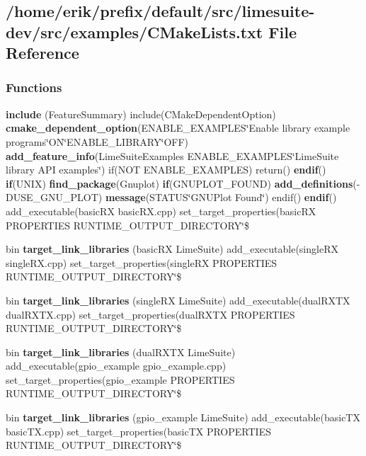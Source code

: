 \subsection{/home/erik/prefix/default/src/limesuite-\/dev/src/examples/\+C\+Make\+Lists.txt File Reference}
\label{limesuite-dev_2src_2examples_2CMakeLists_8txt}
\subsubsection*{Functions}
\begin{DoxyCompactItemize}
\item 
{\bf include} (Feature\+Summary) include(C\+Make\+Dependent\+Option) {\bf cmake\+\_\+dependent\+\_\+option}(E\+N\+A\+B\+L\+E\+\_\+\+E\+X\+A\+M\+P\+L\+ES\char`\"{}Enable library example programs\char`\"{}ON\char`\"{}E\+N\+A\+B\+L\+E\+\_\+\+L\+I\+B\+R\+A\+RY\char`\"{}O\+FF) {\bf add\+\_\+feature\+\_\+info}(Lime\+Suite\+Examples E\+N\+A\+B\+L\+E\+\_\+\+E\+X\+A\+M\+P\+L\+ES\char`\"{}Lime\+Suite library A\+PI examples\char`\"{}) if(N\+OT E\+N\+A\+B\+L\+E\+\_\+\+E\+X\+A\+M\+P\+L\+ES) return() {\bf endif}() {\bf if}(U\+N\+IX) {\bf find\+\_\+package}(Gnuplot) {\bf if}(G\+N\+U\+P\+L\+O\+T\+\_\+\+F\+O\+U\+ND) {\bf add\+\_\+definitions}(-\/D\+U\+S\+E\+\_\+\+G\+N\+U\+\_\+\+P\+L\+OT) {\bf message}(S\+T\+A\+T\+US\char`\"{}G\+N\+U\+Plot Found\char`\"{}) endif() {\bf endif}() add\+\_\+executable(basic\+RX basic\+R\+X.\+cpp) set\+\_\+target\+\_\+properties(basic\+RX P\+R\+O\+P\+E\+R\+T\+I\+ES R\+U\+N\+T\+I\+M\+E\+\_\+\+O\+U\+T\+P\+U\+T\+\_\+\+D\+I\+R\+E\+C\+T\+O\+RY\char`\"{}\$
\item 
bin {\bf target\+\_\+link\+\_\+libraries} (basic\+RX Lime\+Suite) add\+\_\+executable(single\+RX single\+R\+X.\+cpp) set\+\_\+target\+\_\+properties(single\+RX P\+R\+O\+P\+E\+R\+T\+I\+ES R\+U\+N\+T\+I\+M\+E\+\_\+\+O\+U\+T\+P\+U\+T\+\_\+\+D\+I\+R\+E\+C\+T\+O\+RY\char`\"{}\$
\item 
bin {\bf target\+\_\+link\+\_\+libraries} (single\+RX Lime\+Suite) add\+\_\+executable(dual\+R\+X\+TX dual\+R\+X\+T\+X.\+cpp) set\+\_\+target\+\_\+properties(dual\+R\+X\+TX P\+R\+O\+P\+E\+R\+T\+I\+ES R\+U\+N\+T\+I\+M\+E\+\_\+\+O\+U\+T\+P\+U\+T\+\_\+\+D\+I\+R\+E\+C\+T\+O\+RY\char`\"{}\$
\item 
bin {\bf target\+\_\+link\+\_\+libraries} (dual\+R\+X\+TX Lime\+Suite) add\+\_\+executable(gpio\+\_\+example gpio\+\_\+example.\+cpp) set\+\_\+target\+\_\+properties(gpio\+\_\+example P\+R\+O\+P\+E\+R\+T\+I\+ES R\+U\+N\+T\+I\+M\+E\+\_\+\+O\+U\+T\+P\+U\+T\+\_\+\+D\+I\+R\+E\+C\+T\+O\+RY\char`\"{}\$
\item 
bin {\bf target\+\_\+link\+\_\+libraries} (gpio\+\_\+example Lime\+Suite) add\+\_\+executable(basic\+TX basic\+T\+X.\+cpp) set\+\_\+target\+\_\+properties(basic\+TX P\+R\+O\+P\+E\+R\+T\+I\+ES R\+U\+N\+T\+I\+M\+E\+\_\+\+O\+U\+T\+P\+U\+T\+\_\+\+D\+I\+R\+E\+C\+T\+O\+RY\char`\"{}\$
\end{DoxyCompactItemize}


